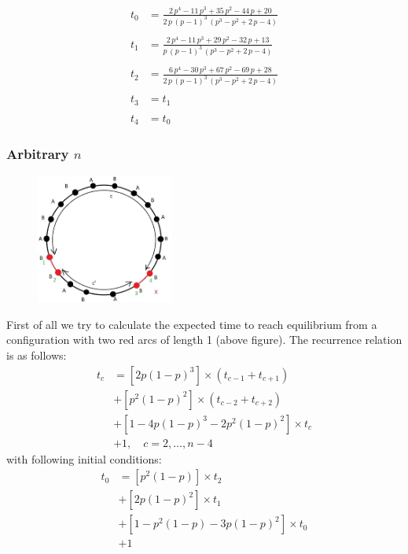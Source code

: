 \documentclass[]{book}
\theoremstyle{definition}
\begin{document}
\begin{equation}
\begin{split}
t_0 &= \frac{2\,p^4-11\,p^3+35\,p^2-44\,p+20}{2\,p\,{\left(p-1\right)}^3\,\left(p^3-p^2+2\,p-4\right)} \\ \\
t_1 &= \frac{2\,p^4-11\,p^3+29\,p^2-32\,p+13}{p\,{\left(p-1\right)}^3\,\left(p^3-p^2+2\,p-4\right)} \\ \\
t_2 &= \frac{6\,p^4-30\,p^3+67\,p^2-69\,p+28}{2\,p\,{\left(p-1\right)}^3\,\left(p^3-p^2+2\,p-4\right)} \\ \\
t_3 &= t_1 \\ \\
t_4 &= t_0
\end{split}
\end{equation}




\subsubsection{Arbitrary $n$}
\begin{figure}[H]
    \centering
    \includegraphics[width=0.4\textwidth]{figures/sync_pure_increase_2.jpg}
    \caption{}
\end{figure}
First of all we try to calculate the expected time to reach equilibrium from a configuration with two red arcs of length 1 (above figure). The recurrence relation is as follows:
\begin{equation}
\begin{split}
    t_c &= \left[2p\left(1-p\right)^3\right] \times \left( t_{c-1}+t_{c+1} \right) \\
    &+ \left[p^2\left(1-p\right)^2\right] \times \left( t_{c-2}+t_{c+2} \right) \\
    &+ \left[1-4p\left(1-p\right)^3-2p^2\left(1-p\right)^2\right] \times t_c \\
    &+ 1,  \quad c = 2,\ldots,n-4
\end{split}
\end{equation}
with following initial conditions:
\begin{equation}
\begin{split}
    t_0 &= \left[ p^2(1-p) \right] \times t_2 \\
    &+ \left[ 2p(1-p)^2 \right] \times t_1 \\
    &+ \left[ 1 -  p^2(1-p) - 3p(1-p)^2 \right] \times t_0 \\
    &+ 1 \\
\end{split}
\end{equation}
\end{document}
